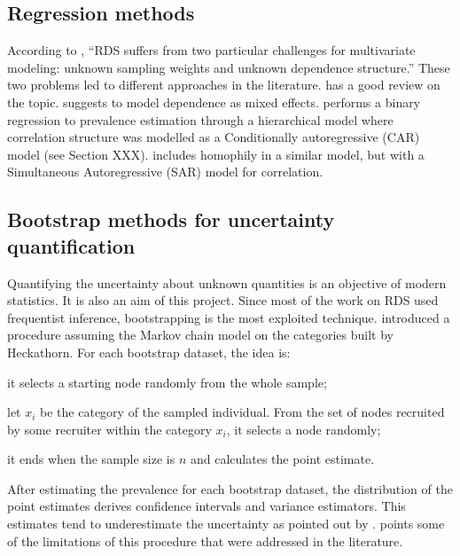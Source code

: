 \subsection{Regression methods}

According to \textcite[p. 86]{gile2018methods}, ``RDS suffers from two particular challenges for multivariate modeling: unknown sampling weights
and unknown dependence structure.'' These two problems led to different
approaches in the literature. \textcite[p.
13-15]{avery2021statistical} has a good review on the
topic. \textcite{spiller2009regression} suggests to model dependence as mixed
effects. \textcite{bastos2012binary} performs a binary regression to
prevalence estimation through a hierarchical model where correlation structure
was modelled as a Conditionally autoregressive (CAR) model (see Section XXX).
\textcite{yauck2021general} includes homophily in a similar model, but with a
Simultaneous Autoregressive (SAR) model \cite[p. 98]{banerjee2003hierarchical} for correlation.

\subsection{Bootstrap methods for uncertainty quantification}

Quantifying the uncertainty about unknown quantities is an objective of modern
statistics. It is also an aim of this project. Since most of the work on RDS
used frequentist inference, bootstrapping is the most exploited technique.
\cite{salganik2006variance} introduced a procedure assuming the Markov chain
model on the categories built by Heckathorn. For each bootstrap dataset, the
idea is:
\begin{alineas}
  \item it selects a starting node randomly from the whole sample;
  \item let $x_i$ be the category of the sampled individual. From the set of nodes recruited by some recruiter within the category $x_i$, it selects a node randomly;
  \item it ends when the sample size is $n$ and calculates the point estimate. 
\end{alineas}
After estimating the prevalence for each bootstrap dataset, 
the distribution of the point estimates derives confidence intervals and 
variance estimators. This estimates tend to underestimate the uncertainty as
pointed out by \textcite[p. 6746]{goel2010assessing}. \textcite[p. 80]{gile2018methods} points some of the
limitations of this procedure that were addressed in the literature.

